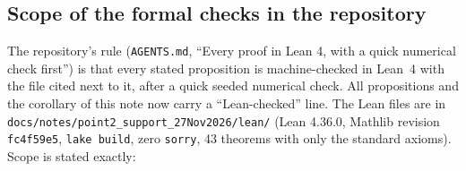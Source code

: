 \documentclass[11pt]{article}
\theoremstyle{remark}
\theoremstyle{definition}
\newcommand{\1}{\mathbf{1}}
\newcommand{\file}[1]{\nolinkurl{#1}}
\begin{document}
\subsection{Scope of the formal checks in the repository}
\label{sec:scope}

The repository's rule (\file{AGENTS.md}, ``Every proof in Lean 4, with a quick numerical check first'') is that every stated proposition is machine-checked in Lean~4 with the file cited next to it, after a quick seeded numerical check. All propositions and the corollary of this note now carry a ``Lean-checked'' line. The Lean files are in \file{docs/notes/point2\_support\_27Nov2026/lean/} (Lean 4.36.0, Mathlib revision \texttt{fc4f59e5}, \texttt{lake build}, zero \texttt{sorry}, 43 theorems with only the standard axioms). Scope is stated exactly:
\end{document}
